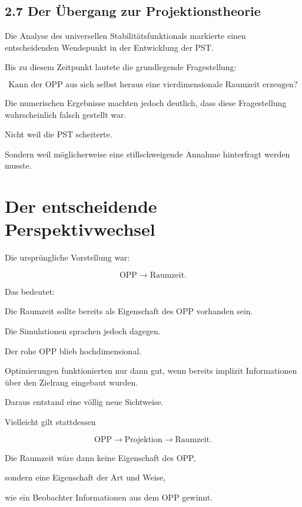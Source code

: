 \subsection{2.7 Der Übergang zur Projektionstheorie}

Die Analyse des universellen Stabilitätsfunktionals markierte einen entscheidenden Wendepunkt in der Entwicklung der PST.

Bis zu diesem Zeitpunkt lautete die grundlegende Fragestellung:

\[
\boxed{
\text{Kann der OPP aus sich selbst heraus eine vierdimensionale Raumzeit erzeugen?}
}
\]

Die numerischen Ergebnisse machten jedoch deutlich, dass diese Fragestellung wahrscheinlich falsch gestellt war.

Nicht weil die PST scheiterte.

Sondern weil möglicherweise eine stillschweigende Annahme hinterfragt werden musste.


\section*{Der entscheidende Perspektivwechsel}

Die ursprüngliche Vorstellung war:

\[
\text{OPP}
\longrightarrow
\text{Raumzeit}.
\]

Das bedeutet:

Die Raumzeit sollte bereits als Eigenschaft des OPP vorhanden sein.

Die Simulationen sprachen jedoch dagegen.

Der rohe OPP blieb hochdimensional.

Optimierungen funktionierten nur dann gut, wenn bereits implizit Informationen über den Zielrang eingebaut wurden.

Daraus entstand eine völlig neue Sichtweise.

Vielleicht gilt stattdessen

\[
\boxed{
\text{OPP}
\longrightarrow
\text{Projektion}
\longrightarrow
\text{Raumzeit}.
}
\]

Die Raumzeit wäre dann keine Eigenschaft des OPP,

sondern eine Eigenschaft der Art und Weise,

wie ein Beobachter Informationen aus dem OPP gewinnt.


